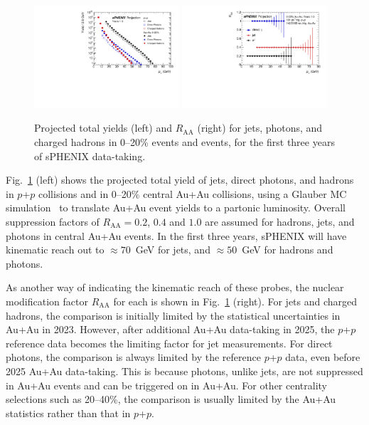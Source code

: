 \begin{figure}[h]
\centering
\includegraphics[width=0.48\textwidth]{figs/master_Years13_yields.pdf}
\includegraphics[width=0.48\textwidth]{figs/RAA_jet_1.pdf}
\caption{Projected total yields (left) and $R_\mathrm{AA}$ (right) for jets, photons, and charged hadrons in 0--20\% \auau events and \pp events, for the first three years of sPHENIX data-taking.}
\label{fig:jet_RAA_proj}
\end{figure}

Fig.~\ref{fig:jet_RAA_proj} (left) shows the projected total yield of jets, direct photons, and hadrons in $p$+$p$ collisions and in 0--20\% central Au+Au collisions, using a Glauber MC simulation~\cite{Miller:2007ri} to translate Au+Au event yields to a partonic luminosity. Overall suppression factors of $R_\mathrm{AA} = 0.2$, $0.4$ and $1.0$ are assumed for hadrons, jets, and photons in central Au+Au events. In the first three years, sPHENIX will have kinematic reach out to $\approx 70$~GeV for jets, and $\approx50$~GeV for hadrons and photons.  

As another way of indicating the kinematic reach of these probes, the nuclear modification factor $R_\mathrm{AA}$ for each is shown in Fig.~\ref{fig:jet_RAA_proj} (right). For jets and charged hadrons, the comparison is initially limited by the statistical uncertainties in Au+Au in 2023. However, after additional Au+Au data-taking in 2025, the $p$+$p$ reference data becomes the limiting factor for jet measurements. For direct photons, the comparison is always limited by the reference $p$+$p$ data, even before 2025 Au+Au data-taking. This is because photons, unlike jets, are not suppressed in Au+Au events and can be triggered on in Au+Au. For other centrality selections such as 20--40\%, the comparison is usually limited by the Au+Au statistics rather than that in $p$+$p$.

